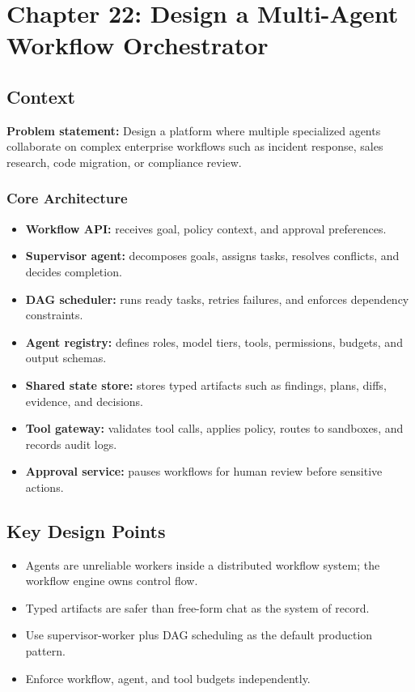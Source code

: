 \chapter{Chapter 22: Design a Multi-Agent Workflow Orchestrator}

\section*{Context}
\textbf{Problem statement:} Design a platform where multiple specialized agents collaborate on complex enterprise workflows such as incident response, sales research, code migration, or compliance review.

\subsection*{Core Architecture}
\begin{itemize}
  \item \textbf{Workflow API:} receives goal, policy context, and approval preferences.
  \item \textbf{Supervisor agent:} decomposes goals, assigns tasks, resolves conflicts, and decides completion.
  \item \textbf{DAG scheduler:} runs ready tasks, retries failures, and enforces dependency constraints.
  \item \textbf{Agent registry:} defines roles, model tiers, tools, permissions, budgets, and output schemas.
  \item \textbf{Shared state store:} stores typed artifacts such as findings, plans, diffs, evidence, and decisions.
  \item \textbf{Tool gateway:} validates tool calls, applies policy, routes to sandboxes, and records audit logs.
  \item \textbf{Approval service:} pauses workflows for human review before sensitive actions.
\end{itemize}

\section*{Key Design Points}
\begin{itemize}
  \item Agents are unreliable workers inside a distributed workflow system; the workflow engine owns control flow.
  \item Typed artifacts are safer than free-form chat as the system of record.
  \item Use supervisor-worker plus DAG scheduling as the default production pattern.
  \item Enforce workflow, agent, and tool budgets independently.
\end{itemize}

